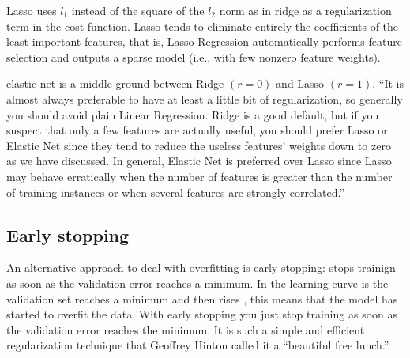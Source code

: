 \documentclass[11pt]{article}
\begin{document}
Lasso uses $l_1$ instead of the square of the $l_2$ norm as in ridge as a regularization term in the cost function. Lasso tends to eliminate entirely the coefficients of the least important features, that is, Lasso Regression automatically performs feature selection and outputs a sparse model (i.e., with few nonzero feature weights).

elastic net is a middle ground between Ridge $(r=0)$ and Lasso $(r=1)$. “It is almost always preferable to have at least a little bit of regularization, so generally you should avoid plain Linear Regression. Ridge is a good default, but if you suspect that only a few features are actually useful, you should prefer Lasso or Elastic Net since they tend to reduce the useless features’ weights down to zero as we have discussed. In general, Elastic Net is preferred over Lasso since Lasso may behave erratically when the number of features is greater than the number of training instances or when several features are strongly correlated.”

\subsection{Early stopping}
An alternative approach to deal with overfitting is early stopping: stops trainign as soon as the validation error reaches a minimum. In the learning curve is the validation set reaches a minimum and then rises , this means that the model has started to overfit the data. With early stopping you just stop training as soon as the validation error reaches the minimum. It is such a simple and efficient regularization technique that Geoffrey Hinton called it a “beautiful free lunch.”
\end{document}
